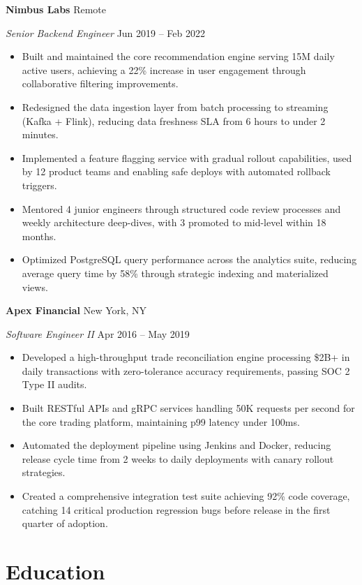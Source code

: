\documentclass[11pt,letterpaper]{article}
\newcommand{\cvtitleentry}[4]{%
  \noindent
  {\bfseries #1} \hfill {\small\color{GrayRule} #2}\par
  \noindent
  {\itshape\color{PriBlue} #3} \hfill {\small\color{GrayRule} #4}\par
}
\begin{document}
\cvtitleentry{Nimbus Labs}{Remote}{Senior Backend Engineer}{Jun 2019 -- Feb 2022}

\begin{itemize}
  \item Built and maintained the core recommendation engine serving 15M daily active users, achieving a 22\% increase in user engagement through collaborative filtering improvements.
  \item Redesigned the data ingestion layer from batch processing to streaming (Kafka + Flink), reducing data freshness SLA from 6 hours to under 2 minutes.
  \item Implemented a feature flagging service with gradual rollout capabilities, used by 12 product teams and enabling safe deploys with automated rollback triggers.
  \item Mentored 4 junior engineers through structured code review processes and weekly architecture deep-dives, with 3 promoted to mid-level within 18 months.
  \item Optimized PostgreSQL query performance across the analytics suite, reducing average query time by 58\% through strategic indexing and materialized views.
\end{itemize}

\cvtitleentry{Apex Financial}{New York, NY}{Software Engineer II}{Apr 2016 -- May 2019}

\begin{itemize}
  \item Developed a high-throughput trade reconciliation engine processing \$2B+ in daily transactions with zero-tolerance accuracy requirements, passing SOC 2 Type II audits.
  \item Built RESTful APIs and gRPC services handling 50K requests per second for the core trading platform, maintaining p99 latency under 100ms.
  \item Automated the deployment pipeline using Jenkins and Docker, reducing release cycle time from 2 weeks to daily deployments with canary rollout strategies.
  \item Created a comprehensive integration test suite achieving 92\% code coverage, catching 14 critical production regression bugs before release in the first quarter of adoption.
\end{itemize}

\section{Education}
\end{document}
